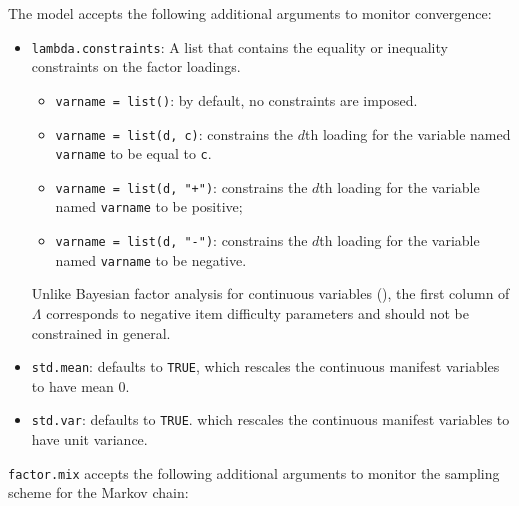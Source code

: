The model accepts the following additional arguments to monitor
convergence:  
\begin{itemize}
\item \texttt{lambda.constraints}: A list that contains the equality or 
inequality constraints on the factor loadings. 

\begin{itemize}

\item {\tt varname = list()}: by default, no constraints are
imposed.

\item \texttt{varname = list(d, c)}: constrains the
$d$th loading for the variable named \texttt{varname} to be equal to \texttt{c}.

\item \texttt{varname = list(d, "+")}: constrains the
$d$th loading for the variable named \texttt{varname} to be positive;

\item \texttt{varname = list(d, "-")}: constrains the
$d$th loading for the variable named \texttt{varname} to be negative.
\end{itemize} 
Unlike Bayesian factor analysis for continuous variables
(), the first column of $\Lambda$ corresponds to
negative item difficulty parameters and should not be constrained in
general.

\item \texttt{std.mean}: defaults to {\tt TRUE}, which rescales the
continuous manifest variables to have mean 0.  

\item \texttt{std.var}: defaults to {\tt TRUE}. which rescales the
continuous manifest variables to have unit variance.  
\end{itemize}


\noindent \texttt{factor.mix} accepts the following additional arguments 
to monitor the sampling scheme for the Markov chain:

